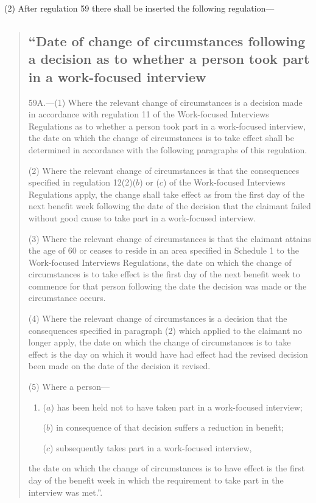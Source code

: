 \documentclass[12pt,a4paper]{article}
\begin{document}
(2) After regulation 59 there shall be inserted the following regulation—
\begin{quotation}
\subsection*{“Date of change of circumstances following a decision as to whether a person took part in a work-focused interview}

59A.---(1)  Where the relevant change of circumstances is a decision made in accordance with regulation 11 of the Work-focused Interviews Regulations as to whether a person took part in a work-focused interview, the date on which the change of circumstances is to take effect shall be determined in accordance with the following paragraphs of this regulation.

(2) Where the relevant change of circumstances is that the consequences specified in regulation 12(2)($b$)  or ($c$)  of the Work-focused Interviews Regulations apply, the change shall take effect as from the first day of the next benefit week following the date of the decision that the claimant failed without good cause to take part in a work-focused interview.

(3) Where the relevant change of circumstances is that the claimant attains the age of 60 or ceases to reside in an area specified in Schedule 1 to the Work-focused Interviews Regulations, the date on which the change of circumstances is to take effect is the first day of the next benefit week to commence for that person following the date the decision was made or the circumstance occurs.

(4) Where the relevant change of circumstances is a decision that the consequences specified in paragraph (2) which applied to the claimant no longer apply, the date on which the change of circumstances is to take effect is the day on which it would have had effect had the revised decision been made on the date of the decision it revised.

(5) Where a person—
\begin{enumerate}\item[]
($a$) has been held not to have taken part in a work-focused interview;

($b$) in consequence of that decision suffers a reduction in benefit;

($c$) subsequently takes part in a work-focused interview,
\end{enumerate}
the date on which the change of circumstances is to have effect is the first day of the benefit week in which the requirement to take part in the interview was met.”.
\end{quotation}
\end{document}
